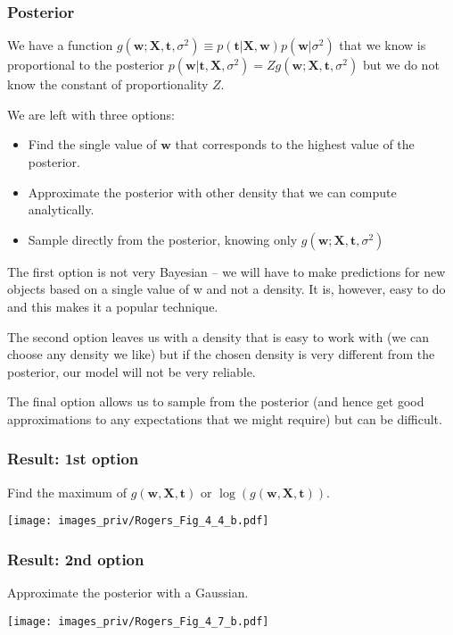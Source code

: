 \documentclass[english,10pt,aspectratio=169,fleqn]{beamer}
\begin{document}
\begin{frame} %
\frametitle{Posterior}

We have a function $g(\mathbf{w}; \mathbf{X},\mathbf{t},\sigma^2) \equiv
p(\mathbf{t} | \mathbf{X},\mathbf{w}) p(\mathbf{w}|\sigma^2)$
that we know is proportional to the posterior $p(\mathbf{w} | \mathbf{t}, \mathbf{X}, 
\sigma^2) = Z g(\mathbf{w}; \mathbf{X},\mathbf{t},\sigma^2)$
but we do not know the constant of proportionality $Z$.

We are left with three options:
\begin{itemize}
\item Find the single value of $\mathbf{w}$ that corresponds to the highest
value of the posterior.
\item Approximate the posterior with other density that we can compute analytically.
\item Sample directly from the posterior, knowing only
$g(\mathbf{w}; \mathbf{X},\mathbf{t},\sigma^2)$
\end{itemize}

The first option is not very Bayesian – we will have to make predictions for new
objects based on a single value of w and not a density. It is, however, easy to do and
this makes it a popular technique.

The second option leaves us with a density that
is easy to work with (we can choose any density we like) but if the chosen density
is very different from the posterior, our model will not be very reliable.

The final
option allows us to sample from the posterior (and hence get good approximations
to any expectations that we might require) but can be difficult.

\end{frame}

\begin{frame}
\frametitle{Result: 1st option}

Find the maximum of $g(\mathbf{w},\mathbf{X},\mathbf{t})$ or
$\log(g(\mathbf{w},\mathbf{X},\mathbf{t}))$.

{\centering
\texttt{[image: images\_priv/Rogers\_Fig\_4\_4\_b.pdf]}
\par}

\end{frame}


\begin{frame} %
\frametitle{Result: 2nd option}

Approximate the posterior with a Gaussian.

{\centering
\texttt{[image: images\_priv/Rogers\_Fig\_4\_7\_b.pdf]}
\par}
\end{frame}
\end{document}
